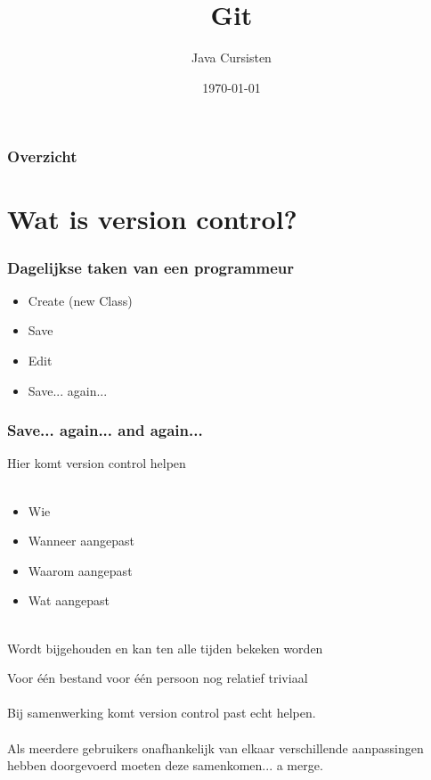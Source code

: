 \documentclass{beamer}
\title{Git}
\author{Java Cursisten}
\institute{INTEC Brussel}
\date{\today}
\begin{document}
\begin{frame}

\titlepage

\end{frame}


\begin{frame}

\frametitle{Overzicht}
{\LARGE \tableofcontents}

\end{frame}


\section{Wat is version control?}


\begin{frame}

\frametitle{Dagelijkse taken van een programmeur}

\begin{itemize}
\item {\LARGE Create (new Class)}
\item {\LARGE Save}
\item {\LARGE Edit}
\item {\LARGE Save... again...}
\end{itemize} 

\end{frame}


\begin{frame}

\frametitle{Save... again... and again...}

{\LARGE Hier komt version control helpen}\\~\\

\begin{itemize}
\item {\LARGE Wie} 
\item {\LARGE Wanneer aangepast}
\item {\LARGE Waarom aangepast}
\item {\LARGE Wat aangepast}\\~\\
\end{itemize}

{\LARGE Wordt bijgehouden en kan ten alle tijden bekeken worden}

\end{frame}


\begin{frame}

{\LARGE Voor \'e\'en bestand voor \'e\'en persoon nog relatief triviaal\\~\\

Bij samenwerking komt version control past echt helpen.\\~\\

Als meerdere gebruikers onafhankelijk van elkaar verschillende aanpassingen
hebben doorgevoerd moeten deze samenkomen... a merge.\\~\\}

\end{frame}
\end{document}
